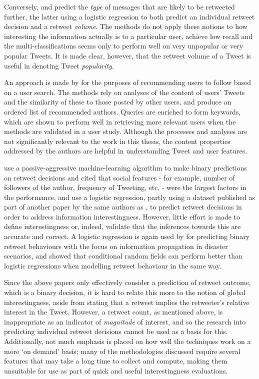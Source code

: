 Conversely, \citet{suh10} and \citet{hong11} predict the \textit{type} of messages that are likely to be retweeted further, the latter using a logistic regression to both predict an individual retweet decision and a retweet \textit{volume}. The methods do not apply these notions to how interesting the information actually is to a particular user, achieve low recall and the multi-classifications seems only to perform well on very unpopular or very popular Tweets. It is made clear, however, that the retweet volume of a Tweet is useful in denoting Tweet \textit{popularity}.

An approach is made by \citet{celebi12} for the purposes of recommending users to follow based on a user search. The methods rely on analyses of the content of users' Tweets and the similarity of these to those posted by other users, and produce an ordered list of recommended authors. Queries are enriched to form keywords, which are shown to perform well in retrieving more relevant users when the methods are validated in a user study. Although the processes and analyses are not significantly relevant to the work in this thesis, the content properties addressed by the authors are helpful in understanding Tweet and user features. 

\citet{petrovic11} use a passive-aggressive machine-learning algorithm to make binary predictions on retweet decisions and cited that social features - for example, number of followers of the author, frequency of Tweeting, etc. - were the largest factors in the performance, and \citet{naveed11} use a logistic regression, partly using a dataset published as part of another paper by the same authors as \citet{petrovic11}, to predict retweet decisions in order to address information interestingness. However, little effort is made to define interestingness or, indeed, validate that the inferences towards this are accurate and correct. A logistic regression is again used by \citet{zhu11} for predicting binary retweet behaviours with the focus on information propagation in disaster scenarios, and \citet{peng11} showed that conditional random fields can perform better than logistic regressions when modelling retweet behaviour in the same way.

Since the above papers only effectively consider a prediction of retweet outcome, which is a binary decision, it is hard to relate this more to the notion of global interestingness, aside from stating that a retweet implies the retweeter's relative interest in the Tweet. However, a retweet count, as mentioned above, is inappropriate as an indicator of \textit{magnitude} of interest, and so the research into predicting individual retweet decisions cannot be used as a basis for this. Additionally, not much emphasis is placed on how well the techniques work on a more `on demand' basis; many of the methodologies discussed require several features that may take a long time to collect and compute, making them unsuitable for use as part of quick and useful interestingness evaluations.


